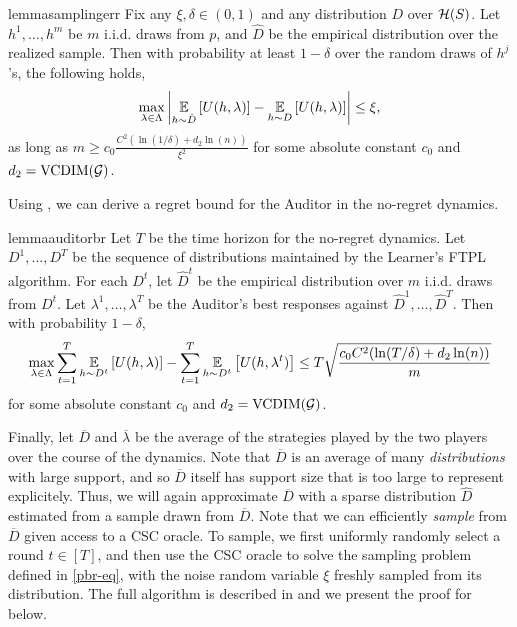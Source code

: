 \begin{restatable}{lemma}{samplingerr}\label{lem:sampling-err}
  Fix any $\xi, \delta \in (0, 1)$ and any distribution $D$ over
  $\mathcal{H}(S)$.  Let $h^1, \ldots, h^m$ be $m$ i.i.d. draws from $p$, and
  $\hat D$ be the empirical distribution over the realized
  sample. Then with probability at least $1 - \delta$ over the random
  draws of $h^j$'s, the following holds,
  \[
    \max_{\lambda\in \Lambda} \left| \operatorname*{\mathbb{E}}_{h\sim \hat D}\left[U(h, \lambda)\right]
      - \operatorname*{\mathbb{E}}_{h\sim D}\left[U(h, \lambda)\right] \right| \leq \xi,
  \]
  as long as $m \geq c_0\frac{C^2\left(\ln(1/\delta) + d_2\ln(n)\right)}{\xi^2}$
  for some absolute constant $c_0$ and $d_2 = \mathrm{VCDIM}(\mathcal{G})$.
\end{restatable}


\noindent Using , we can derive a regret bound
for the Auditor in the no-regret dynamics.



\begin{restatable}{lemma}{auditorbr}\label{lem:auditor-br}
  Let $T$ be the time horizon for the no-regret dynamics. Let
  $D^1, \ldots, D^T$ be the sequence of distributions maintained by
  the Learner's FTPL algorithm. For each $D^t$, let $\hat D^t$ be the
  empirical distribution over $m$ i.i.d. draws from $D^t$. Let
  $\lambda^1, \ldots, \lambda^T$ be the Auditor's best responses
  against $\hat D^1, \ldots , \hat D^T$. Then with probability
  $1 - \delta$,
 \[
   \max_{\lambda\in \Lambda}\sum_{t= 1}^T \operatorname*{\mathbb{E}}_{h\sim D^t}\left[U(h,
     \lambda)\right] - \sum_{t=1}^T\operatorname*{\mathbb{E}}_{h \sim D^t}\left[ U(h, \lambda^t) \right]\leq T
   \sqrt{\frac{c_0 C^2 (\ln(T/\delta) + d_2 \ln(n))}{m}}
  \]
  for some absolute constant $c_0$ and $d_2 = \mathrm{VCDIM}(\mathcal{G})$.
\end{restatable}






Finally, let $\overline D$ and $\overline \lambda$ be the average of
the strategies played by the two players over the course of the
dynamics. Note that $\overline D$ is an average of many
\emph{distributions} with large support, and so $\overline D$ itself
has support size that is too large to represent explicitely. Thus, we
will again approximate $\overline D$ with a sparse distribution
$\hat D$ estimated from a sample drawn from $\overline D$. Note that
we can efficiently \emph{sample} from $\overline D$ given access to a
CSC oracle. To sample, we first uniformly randomly select a round
$t\in [T]$, and then use the CSC oracle to solve the sampling problem
defined in \eqref{pbr-eq}, with the noise random variable $\xi$
freshly sampled from its distribution. The full algorithm is described
in  and we present the proof for 
below. %







